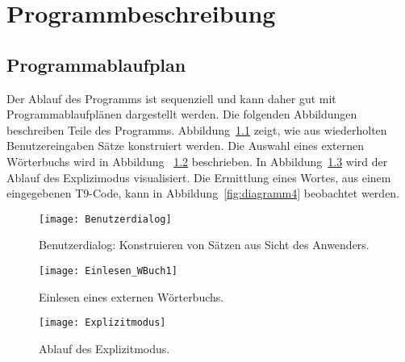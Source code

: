 \chapter{Programmbeschreibung}\label{ch:programmbeschreibung}

\section{Programmablaufplan}\label{sec:pap}
Der Ablauf des Programms ist sequenziell und kann daher gut mit Programmablaufplänen dargestellt werden.
Die folgenden Abbildungen beschreiben Teile des Programms.
Abbildung~\ref{fig:diagramm1} zeigt, wie aus wiederholten Benutzereingaben Sätze konstruiert werden.
Die Auswahl eines externen Wörterbuchs wird in Abbildung ~\ref{fig:diagramm2} beschrieben.
In Abbildung~\ref{fig:diagramm3} wird der Ablauf des Explizimodus visualisiert.
Die Ermittlung eines Wortes, aus einem eingegebenen T9-Code, kann in Abbildung~\ref{fig:diagramm4} beobachtet werden.


\begin{figure}[!h]
    \centering
    \texttt{[image: Benutzerdialog]}
    \caption{
        Benutzerdialog: Konstruieren von Sätzen aus Sicht des Anwenders.
    }
    \label{fig:diagramm1}
\end{figure}

\begin{figure}[!h]
    \centering
    \texttt{[image: Einlesen\_WBuch1]}
    \caption{
        Einlesen eines externen Wörterbuchs.
    }
    \label{fig:diagramm2}
\end{figure}

\begin{figure}[!h]
    \centering
    \texttt{[image: Explizitmodus]}
    \caption{
        Ablauf des Explizitmodus.
    }
    \label{fig:diagramm3}
\end{figure}

